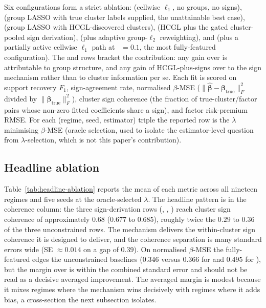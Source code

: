 \documentclass[article]{jss}
\begin{document}
\begin{sloppypar}
Six  configurations form a strict ablation:
 (cellwise $\ell_1$, no groups, no signs), 
(group LASSO with true cluster labels supplied, the unattainable best
case),  (group LASSO with HCGL-discovered clusters),
 (HCGL plus the gated cluster-pooled sign derivation),
 (plus adaptive group-$\ell_2$ reweighting), and
 (plus a partially active cellwise $\ell_1$ path at
~$=0.1$, the most fully-featured configuration). The
 and  rows bracket the contribution: any
gain over  is attributable to group structure, and any gain
of HCGL-plus-signs over  to the sign mechanism rather
than to cluster information per se. Each fit is scored on support
recovery $F_1$, sign-agreement rate, normalised
$\beta$-MSE ($\|\hat{\bm{\beta}} - \bm{\beta}_{\mathrm{true}}\|_F^2$
divided by $\|\bm{\beta}_{\mathrm{true}}\|_F^2$),
cluster sign coherence (the fraction of true-cluster/factor pairs whose
non-zero fitted coefficients share a sign), and factor risk-premium
RMSE. For each (regime, seed, estimator) triple the reported row is the
$\lambda$ minimising $\beta$-MSE (oracle selection, used to isolate the
estimator-level question from $\lambda$-selection, which is not this
paper's contribution).
\end{sloppypar}


\subsection[Headline ablation]{Headline ablation} \label{sec:sim-headline}

Table~\ref{tab:headline-ablation} reports the mean of each metric across
all nineteen regimes and five seeds at the oracle-selected $\lambda$. The
headline pattern is in the coherence column: the three sign-derivation
rows (, , ) reach
cluster sign coherence of approximately $0.68$ ($0.677$ to $0.685$), roughly twice the
$0.29$ to $0.36$ of the three unconstrained rows. The mechanism
delivers the within-cluster sign coherence it is designed to deliver,
and the coherence separation is many standard errors wide (SE
$\approx 0.014$ on a gap of $0.39$). On
normalised $\beta$-MSE the fully-featured  edges the
unconstrained baselines ($0.346$ versus $0.366$ for  and
$0.495$ for ), but the margin over  is within
the combined standard error and should not be read as a decisive
averaged improvement. The averaged margin is modest because it
mixes regimes where the mechanism wins decisively with regimes where it
adds bias, a cross-section the next subsection isolates.
\end{document}
